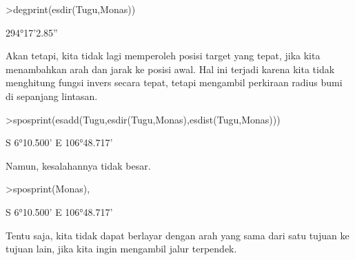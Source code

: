 \documentclass[a4paper,10pt]{article}
\begin{document}
\begin{eulernotebook}
\begin{eulercomment}
\begin{eulercomment}
\begin{eulercomment}
\begin{eulercomment}
\begin{eulercomment}
\begin{eulercomment}
\begin{eulercomment}
\begin{eulercomment}
\begin{eulercomment}
\begin{eulercomment}
\begin{eulercomment}
\begin{eulercomment}
\begin{eulercomment}
\begin{eulercomment}
\begin{eulercomment}
\begin{eulercomment}
\begin{eulercomment}
\begin{eulercomment}
\begin{eulercomment}
\begin{eulercomment}
\begin{eulercomment}
\begin{eulercomment}
\begin{eulercomment}
\begin{eulercomment}
\begin{eulercomment}
\begin{eulercomment}
\begin{eulercomment}
\begin{eulercomment}
\begin{eulercomment}
\begin{eulercomment}
\begin{eulercomment}
\begin{eulercomment}
\begin{eulercomment}
\begin{eulercomment}
\begin{eulercomment}
\begin{eulercomment}
\begin{eulercomment}
\begin{eulercomment}
\begin{eulercomment}
\begin{eulercomment}
\begin{eulercomment}
\begin{eulercomment}
\begin{eulerprompt}
>degprint(esdir(Tugu,Monas))
\end{eulerprompt}
\begin{euleroutput}
  294°17'2.85''
\end{euleroutput}
\begin{eulercomment}
Akan tetapi, kita tidak lagi memperoleh posisi target yang tepat, jika
kita menambahkan arah dan jarak ke posisi awal. Hal ini terjadi karena
kita tidak menghitung fungsi invers secara tepat, tetapi mengambil
perkiraan radius bumi di sepanjang lintasan.
\end{eulercomment}
\begin{eulerprompt}
>sposprint(esadd(Tugu,esdir(Tugu,Monas),esdist(Tugu,Monas)))
\end{eulerprompt}
\begin{euleroutput}
  S 6°10.500' E 106°48.717'
\end{euleroutput}
\begin{eulercomment}
Namun, kesalahannya tidak besar.
\end{eulercomment}
\begin{eulerprompt}
>sposprint(Monas),
\end{eulerprompt}
\begin{euleroutput}
  S 6°10.500' E 106°48.717'
\end{euleroutput}
\begin{eulercomment}
Tentu saja, kita tidak dapat berlayar dengan arah yang sama dari satu
tujuan ke tujuan lain, jika kita ingin mengambil jalur terpendek.

\end{eulercomment}
\end{eulercomment}
\end{eulercomment}
\end{eulercomment}
\end{eulercomment}
\end{eulercomment}
\end{eulercomment}
\end{eulercomment}
\end{eulercomment}
\end{eulercomment}
\end{eulercomment}
\end{eulercomment}
\end{eulercomment}
\end{eulercomment}
\end{eulercomment}
\end{eulercomment}
\end{eulercomment}
\end{eulercomment}
\end{eulercomment}
\end{eulercomment}
\end{eulercomment}
\end{eulercomment}
\end{eulercomment}
\end{eulercomment}
\end{eulercomment}
\end{eulercomment}
\end{eulercomment}
\end{eulercomment}
\end{eulercomment}
\end{eulercomment}
\end{eulercomment}
\end{eulercomment}
\end{eulercomment}
\end{eulercomment}
\end{eulercomment}
\end{eulercomment}
\end{eulercomment}
\end{eulercomment}
\end{eulercomment}
\end{eulercomment}
\end{eulercomment}
\end{eulercomment}
\end{eulercomment}
\end{eulernotebook}
\end{document}
